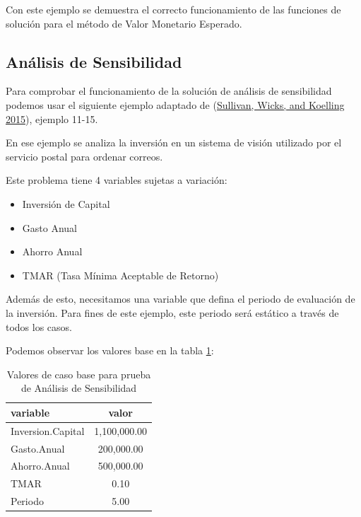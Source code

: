 \documentclass[
]{book}
\providecommand{\tightlist}{%
  \setlength{\itemsep}{0pt}\setlength{\parskip}{0pt}}
\begin{document}
Con este ejemplo se demuestra el correcto funcionamiento de las
funciones de solución para el método de Valor Monetario Esperado.

\newpage

\hypertarget{anuxe1lisis-de-sensibilidad-1}{%
\subsection{Análisis de Sensibilidad}\label{anuxe1lisis-de-sensibilidad-1}}

Para comprobar el funcionamiento de la solución de análisis de
sensibilidad podemos usar el siguiente ejemplo adaptado de
(\protect\hyperlink{ref-Sullivan2015}{Sullivan, Wicks, and Koelling 2015}), ejemplo 11-15.

En ese ejemplo se analiza la inversión en un sistema de visión utilizado
por el servicio postal para ordenar correos.

Este problema tiene 4 variables sujetas a variación:

\begin{itemize}
\tightlist
\item
  Inversión de Capital
\item
  Gasto Anual
\item
  Ahorro Anual
\item
  TMAR (Tasa Mínima Aceptable de Retorno)
\end{itemize}

Además de esto, necesitamos una variable que defina el periodo de
evaluación de la inversión. Para fines de este ejemplo, este periodo
será estático a través de todos los casos.

Podemos observar los valores base en la tabla \ref{tab:testsens1}:

\begin{table}

\caption{\label{tab:testsens1}Valores de caso base para prueba de Análisis de Sensibilidad}
\centering
\begin{tabular}[t]{l|c}
\hline
variable & valor\\
\hline
Inversion.Capital & 1,100,000.00\\
\hline
Gasto.Anual & 200,000.00\\
\hline
Ahorro.Anual & 500,000.00\\
\hline
TMAR & 0.10\\
\hline
Periodo & 5.00\\
\hline
\end{tabular}
\end{table}
\end{document}
